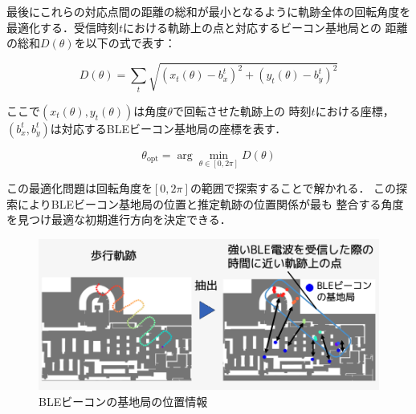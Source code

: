 最後にこれらの対応点間の距離の総和が最小となるように軌跡全体の回転角度を
最適化する．受信時刻$t$における軌跡上の点と対応するビーコン基地局との
距離の総和$D(\theta)$を以下の式で表す：

\begin{equation}
D(\theta) = \sum_{t} \sqrt{(x_t(\theta) - b_x^t)^2 + (y_t(\theta) - b_y^t)^2}
\end{equation}

ここで$(x_t(\theta), y_t(\theta))$は角度$\theta$で回転させた軌跡上の
時刻$t$における座標，$(b_x^t, b_y^t)$は対応するBLEビーコン基地局の座標を表す．

\begin{equation}
\theta_{\mathrm{opt}} = \arg\min_{\theta \in [0, 2\pi]} D(\theta)
\end{equation}

この最適化問題は回転角度を$[0, 2\pi]$の範囲で探索することで解かれる．
この探索によりBLEビーコン基地局の位置と推定軌跡の位置関係が最も
整合する角度を見つけ最適な初期進行方向を決定できる．

\begin{figure}[H]
	\centering
	\includegraphics[width=\linewidth]{image/ble-merge.jpg}
	\caption{BLEビーコンの基地局の位置情報}    \label{fig:ble-merge}
\end{figure}







